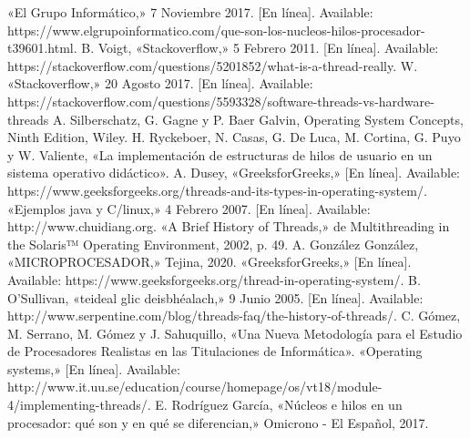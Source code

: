 \documentclass[12pt,letterpaper]{article}
\begin{document}
\begin{thebibliography}{99}

 «El Grupo Informático,» 7 Noviembre 2017. [En línea]. Available: https://www.elgrupoinformatico.com/que-son-los-nucleos-hilos-procesador-t39601.html.
 B. Voigt, «Stackoverflow,» 5 Febrero 2011. [En línea]. Available: https://stackoverflow.com/questions/5201852/what-is-a-thread-really.
 W. «Stackoverflow,» 20 Agosto 2017. [En línea]. Available: https://stackoverflow.com/questions/5593328/software-threads-vs-hardware-threads
 A. Silberschatz, G. Gagne y P. Baer Galvin, Operating System Concepts, Ninth Edition, Wiley. 
 H. Ryckeboer, N. Casas, G. De Luca, M. Cortina, G. Puyo y W. Valiente, «La implementación de estructuras de hilos de usuario en un sistema operativo didáctico».
 A. Dusey, «GreeksforGreeks,» [En línea]. Available: https://www.geeksforgeeks.org/threads-and-its-types-in-operating-system/.
 «Ejemplos java y C/linux,» 4 Febrero 2007. [En línea]. Available: http://www.chuidiang.org.
 «A Brief History of Threads,» de Multithreading in the Solaris™ Operating Environment, 2002, p. 49.
 A. González González, «MICROPROCESADOR,» Tejina, 2020.
 «GreeksforGreeks,» [En línea]. Available: https://www.geeksforgeeks.org/thread-in-operating-system/.
 B. O'Sullivan, «teideal glic deisbhéalach,» 9 Junio 2005. [En línea]. Available: http://www.serpentine.com/blog/threads-faq/the-history-of-threads/.
 C. Gómez, M. Serrano, M. Gómez y J. Sahuquillo, «Una Nueva Metodología para el Estudio de Procesadores Realistas en las Titulaciones de Informática».
 «Operating systems,» [En línea]. Available: \newline http://www.it.uu.se/education/course/homepage/os/vt18/module-4/implementing-threads/.
 E. Rodríguez García, «Núcleos e hilos en un procesador: qué son y en qué se diferencian,» Omicrono - El Español, 2017. 

\end{thebibliography}
\end{document}
